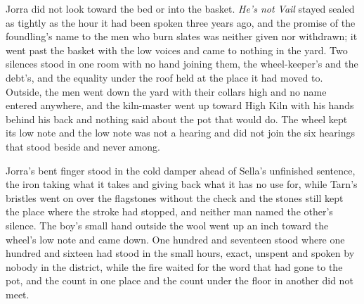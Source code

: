 Jorra did not look toward the bed or into the basket. \emph{He's not Vail} stayed sealed as tightly as the hour it had been spoken three years ago, and the promise of the foundling's name to the men who burn slates was neither given nor withdrawn; it went past the basket with the low voices and came to nothing in the yard. Two silences stood in one room with no hand joining them, the wheel-keeper's and the debt's, and the equality under the roof held at the place it had moved to. Outside, the men went down the yard with their collars high and no name entered anywhere, and the kiln-master went up toward High Kiln with his hands behind his back and nothing said about the pot that would do. The wheel kept its low note and the low note was not a hearing and did not join the six hearings that stood beside and never among.

Jorra's bent finger stood in the cold damper ahead of Sella's unfinished sentence, the iron taking what it takes and giving back what it has no use for, while Tarn's bristles went on over the flagstones without the check and the stones still kept the place where the stroke had stopped, and neither man named the other's silence. The boy's small hand outside the wool went up an inch toward the wheel's low note and came down. One hundred and seventeen stood where one hundred and sixteen had stood in the small hours, exact, unspent and spoken by nobody in the district, while the fire waited for the word that had gone to the pot, and the count in one place and the count under the floor in another did not meet.
